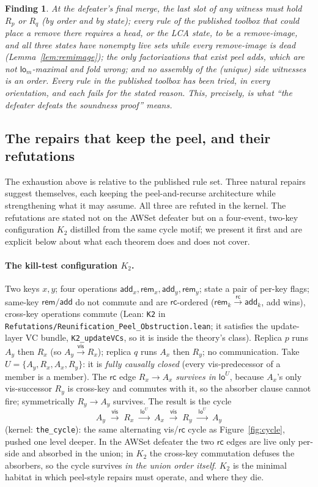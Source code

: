 \documentclass[11pt]{article}
\newtheorem*{finding}{Finding}
\newcommand{\vis}{\xrightarrow{\mathsf{vis}}}
\newcommand{\rc}{\xrightarrow{\mathsf{rc}}}
\newcommand{\rcrel}{\mathsf{rc}}
\newcommand{\add}{\mathsf{add}}
\newcommand{\rem}{\mathsf{rem}}
\newcommand{\loE}[1]{\mathsf{lo}^{#1}}
\newcommand{\lom}{\mathsf{lo}_m}
\newcommand{\lean}[1]{\texttt{#1}}
\newcommand{\Rp}{R_p}
\newcommand{\Rq}{R_q}
\begin{document}
\begin{finding}
At the defeater's final merge, the last slot of any witness must hold
$\Rp$ or $\Rq$ (by order and by state); every rule of the published
toolbox that could place a remove there requires a head, or the LCA
state, to be a remove-image, and all three states have nonempty live
sets while every remove-image is dead
(Lemma~\ref{lem:remimage}); the only factorizations that exist peel
adds, which are not $\lom$-maximal and fold wrong; and no assembly of
the (unique) side witnesses is an order. Every rule in the published
toolbox has been tried, in every orientation, and each fails for the
stated reason. This, precisely, is what ``the defeater defeats the
soundness proof'' means.
\end{finding}

\subsection{The repairs that keep the peel, and their refutations}
\label{sec:repairs}

The exhaustion above is relative to the published rule set. Three
natural repairs suggest themselves, each keeping the peel-and-recurse
architecture while strengthening what it may assume. All three are
refuted in the kernel. The refutations are stated not on the AWSet
defeater but on a four-event, two-key configuration $K_2$ distilled
from the same cycle motif; we present it first and are explicit below
about what each theorem does and does not cover.

\paragraph{The kill-test configuration $K_2$.} Two keys $x, y$; four
operations $\add_x, \rem_x, \add_y, \rem_y$; state a pair of
per-key flags; same-key $\rem/\add$ do not commute and are
$\rcrel$-ordered ($\rem_k \rc \add_k$, add wins), cross-key operations
commute (Lean: \lean{K2} in
\lean{Refutations/Reunification\_Peel\_Obstruction.lean}; it satisfies
the update-layer VC bundle, \lean{K2\_updateVCs}, so it is inside the
theory's class). Replica $p$ runs $A_y$ then $R_x$ (so $A_y \vis
R_x$); replica $q$ runs $A_x$ then $R_y$; no communication. Take
$U = \{A_y, R_x, A_x, R_y\}$: it is \emph{fully causally closed}
(every vis-predecessor of a member is a member). The $\rcrel$ edge
$R_x \to A_x$ \emph{survives in $\loE{U}$}, because $A_x$'s only
vis-successor $R_y$ is cross-key and commutes with it, so the absorber
clause cannot fire; symmetrically $R_y \to A_y$ survives. The result
is the cycle
\[
  A_y \;\vis\; R_x \;\xrightarrow{\ \loE{U}\ }\; A_x \;\vis\;
  R_y \;\xrightarrow{\ \loE{U}\ }\; A_y
\]
(kernel: \lean{the\_cycle}): the same alternating vis/$\rcrel$ cycle
as Figure~\ref{fig:cycle}, pushed one level deeper. In the AWSet
defeater the two $\rcrel$ edges are live only per-side and absorbed in
the union; in $K_2$ the cross-key commutation defuses the absorbers,
so the cycle survives \emph{in the union order itself}. $K_2$ is the
minimal habitat in which peel-style repairs must operate, and where
they die.
\end{document}
